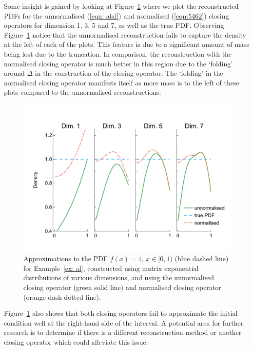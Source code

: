 \begin{example}
Some insight is gained by looking at Figure~\ref{fig: pdf reconstructed} where we plot the reconstructed PDFs for the unnormalised (\ref{eqn: alal}) and normalised (\ref{eqn:5462}) closing operators for dimension 1, 3, 5 and 7, as well as the true PDF. Observing Figure~\ref{fig: pdf reconstructed} notice that the unnormalised reconstruction fails to capture the density at the left of each of the plots. This feature is due to a significant amount of mass being lost due to the truncation. In comparison, the reconstruction with the normalised closing operator is much better in this region due to the `folding' around \(\Delta\) in the construction of the closing operator. The `folding' in the normalised closing operator manifests itself as more mass is to the left of these plots compared to the unnormalised reconstructions. %

\begin{figure}[h]
	\centering
	\includegraphics[width=\textwidth,trim={0cm 1.25cm 0cm 1.25cm},clip]{chapter6/figs/qbdrap_closing_vec/fun4/pdfs_formatted.pdf}
	\caption{Approximations to the PDF \(f(x)=1,\, x\in[0,1)\) (blue dashed line) for Example~\ref{ex: al}, constructed using matrix exponential distributions of various dimensions, and using the unnormalised closing operator (green solid line) and normalised closing operator (orange dash-dotted line).}
	\label{fig: pdf reconstructed}
\end{figure} 
Figure~\ref{fig: pdf reconstructed} also shows that both closing operators fail to approximate the initial condition well at the right-hand side of the interval. A potential area for further research is to determine if there is a different reconstruction method or another closing operator which could alleviate this issue. 
\end{example}

